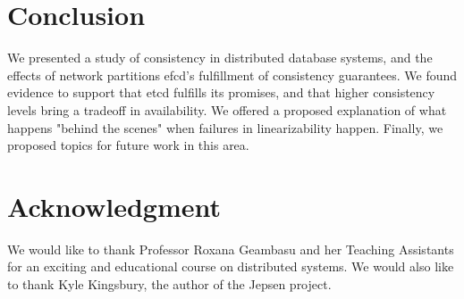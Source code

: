 \documentclass[12pt,conference]{IEEEtran}
\begin{document}



\section{Conclusion}

We presented a study of consistency in distributed database systems, and the effects of network partitions efcd's fulfillment of consistency guarantees. We found evidence to support that etcd fulfills its promises, and that higher consistency levels bring a tradeoff in availability. We offered a proposed explanation of what happens "behind the scenes" when failures in linearizability happen. Finally, we proposed topics for future work in this area.





\section*{Acknowledgment}

We would like to thank Professor Roxana Geambasu and her Teaching Assistants for an exciting and educational course on distributed systems. We would also like to thank Kyle Kingsbury, the author of the Jepsen project.






\end{document}
